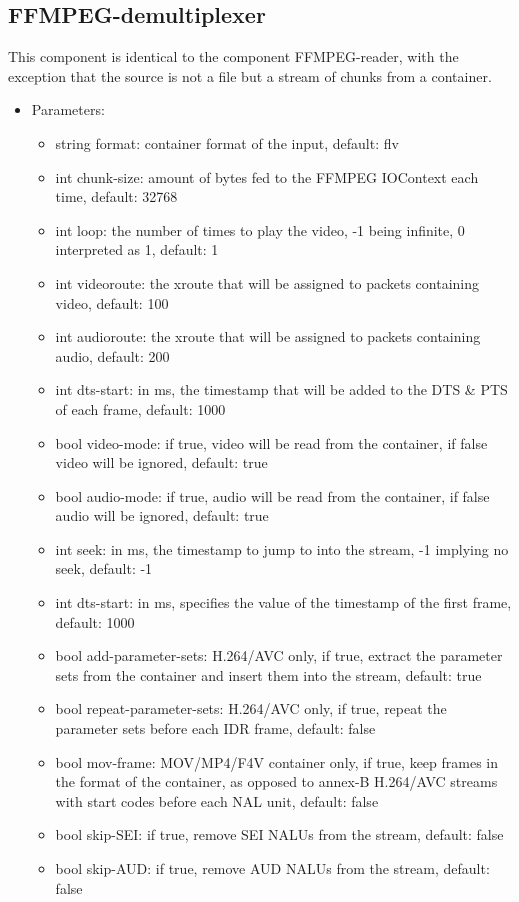 \subsection{FFMPEG-demultiplexer}
This component is identical to the component FFMPEG-reader, with the exception that the source is not a file but a stream of chunks from a container.
\begin{itemize}
\item Parameters:
\begin{itemize}
\item string format: container format of the input, default: flv
\item int chunk-size: amount of bytes fed to the FFMPEG IOContext each time, default: 32768
\item int loop: the number of times to play the video, -1 being infinite, 0 interpreted as 1, default: 1
\item int videoroute: the xroute that will be assigned to packets containing video, default: 100
\item int audioroute: the xroute that will be assigned to packets containing audio, default: 200
\item int dts-start: in ms, the timestamp that will be added to the DTS \& PTS of each frame, default: 1000
\item bool video-mode: if true, video will be read from the container, if false video will be ignored, default: true
\item bool audio-mode: if true, audio will be read from the container, if false audio will be ignored, default: true
\item int seek: in ms, the timestamp to jump to into the stream, -1 implying no seek, default: -1
\item int dts-start: in ms, specifies the value of the timestamp of the first frame, default: 1000
\item bool add-parameter-sets: H.264/AVC only, if true, extract the parameter sets from the container and insert them into the stream, default: true
\item bool repeat-parameter-sets: H.264/AVC only, if true, repeat the parameter sets before each IDR frame, default: false
\item bool mov-frame: MOV/MP4/F4V container only, if true, keep frames in the format of the container, as opposed to annex-B H.264/AVC streams with start codes before each NAL unit, default: false
\item bool skip-SEI: if true, remove SEI NALUs from the stream, default: false
\item bool skip-AUD: if true, remove AUD NALUs from the stream, default: false
\end{itemize}
\end{itemize}
